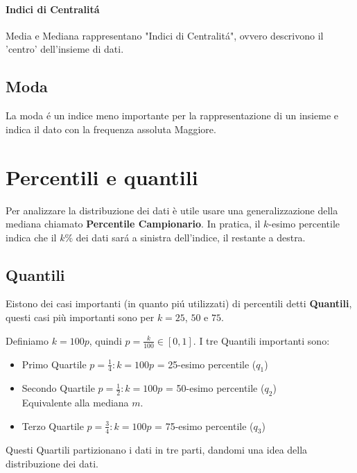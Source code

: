 
\paragraph{Indici di Centralitá} Media e Mediana rappresentano "Indici di Centralitá", ovvero descrivono il 'centro' dell'insieme di dati.

\subsection*{Moda} La moda é un indice meno importante per la rappresentazione di un insieme e indica il dato con la frequenza assoluta Maggiore.

\section{Percentili e quantili}
Per analizzare la distribuzione dei dati è utile usare una generalizzazione della mediana chiamato \textbf{Percentile Campionario}.
In pratica, il $k$-esimo percentile indica che il $k\%$ dei dati sará a sinistra dell'indice, il restante a destra.

\subsection{Quantili}
Eistono dei casi importanti (in quanto piú utilizzati) di percentili detti \textbf{Quantili}, questi casi più importanti sono per $k = 25$, $50$ e $75$.

Definiamo $k = 100p$, quindi $p=\frac{k}{100} \in [0,1]$.
I tre Quantili importanti sono:
\begin{itemize} 
    \item Primo Quartile $p = \frac{1}{4}: k = 100p$ = 25-esimo percentile ($q_1$)
    \item Secondo Quartile $p = \frac{1}{2}: k = 100p$ = 50-esimo percentile ($q_2$) 
    \\ Equivalente alla  mediana $m$.
    \item Terzo Quartile $p = \frac{3}{4}: k = 100p$ = 75-esimo percentile ($q_3$)
\end{itemize}
Questi Quartili partizionano i dati in tre parti, dandomi una idea della distribuzione dei dati.
